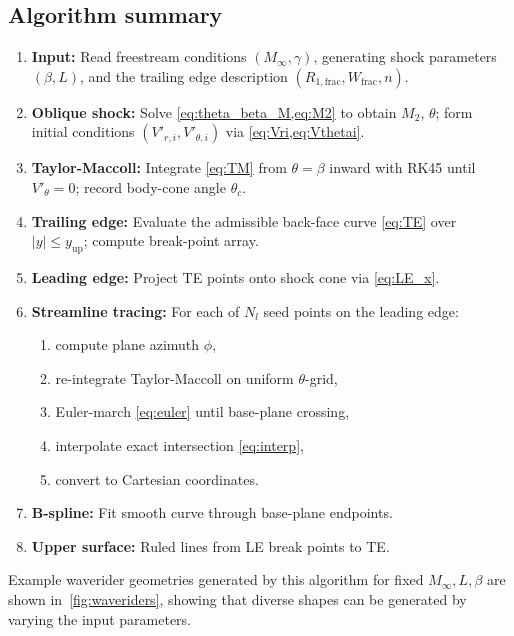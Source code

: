 \documentclass[10pt,a4paper]{article}
\begin{document}
\subsection{Algorithm summary}\label{sec:algorithm}
\begin{enumerate}[label=\textbf{Step \arabic*.}, leftmargin=*, itemsep=4pt]
    \item \textbf{Input:} Read freestream conditions $(M_\infty,\gamma)$, generating shock parameters $(\beta,L)$, and the trailing edge description $(R_{1,\mathrm{frac}}, W_{\mathrm{frac}}, n)$.
    \item \textbf{Oblique shock:} Solve \cref{eq:theta_beta_M,eq:M2} to obtain $M_2$, $\theta$; form initial conditions $(V'_{r,i}, V'_{\theta,i})$ via \cref{eq:Vri,eq:Vthetai}.
    \item \textbf{Taylor-Maccoll:} Integrate \cref{eq:TM} from $\theta = \beta$ inward with RK45 until $V'_\theta = 0$; record body-cone angle $\theta_c$.
    \item \textbf{Trailing edge:} Evaluate the admissible back-face curve \cref{eq:TE} over $|y| \le y_{\mathrm{up}}$; compute break-point array.
    \item \textbf{Leading edge:} Project TE points onto shock cone via \cref{eq:LE_x}.
    \item \textbf{Streamline tracing:} For each of $N_l$ seed points on the leading edge:
          \begin{enumerate}[label=\alph*.]
              \item compute plane azimuth $\phi$,
              \item re-integrate Taylor-Maccoll on uniform $\theta$-grid,
              \item Euler-march \cref{eq:euler} until base-plane crossing,
              \item interpolate exact intersection \cref{eq:interp},
              \item convert to Cartesian coordinates.
          \end{enumerate}
    \item \textbf{B-spline:} Fit smooth curve through base-plane endpoints.
    \item \textbf{Upper surface:} Ruled lines from LE break points to TE.\@
\end{enumerate}

Example waverider geometries generated by this algorithm for fixed $M_\infty,L,\beta$ are shown in~\cref{fig:waveriders}, showing that diverse shapes can be generated by varying the input parameters.
\end{document}
